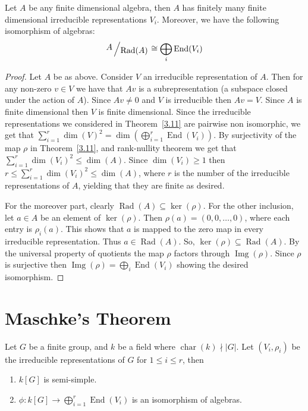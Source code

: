 \begin{corollary}
    Let $A$ be any finite dimensional algebra, then $A$ has finitely many finite dimensional irreducible representations $V_i$. Moreover, we have the following isomorphism of algebras:
    \begin{align*}
    \bigslant{A}{\operatorname{Rad}(A)} \cong \bigoplus_{i} \operatorname{End}(V_i)
    \end{align*}
\end{corollary}
\begin{proof}
    Let $A$ be as above. Consider $V$ an irreducible representation of $A$. Then for any non-zero $v \in V$ we have that $Av$ is a subrepresentation (a subspace closed under the action of $A$). Since $Av \neq 0$ and $V$ is irreducible then $Av = V$. Since $A$ is finite dimensional then $V$ is finite dimensional. Since the irreducible representations we considered in Theorem~\ref{3.11} are pairwise non isomorphic, we get that $\sum_{i =1}^{r} \dim(V)^2 = \dim(\bigoplus_{i=1}^{r} \operatorname{End}(V_i))$. By surjectivity of the map $\rho$ in Theorem~\ref{3.11}, and rank-nullity theorem we get that $\sum_{i =1}^{r} \dim(V_i)^2 \leq \dim(A)$. Since $\dim(V_i) \geq 1$ then $r \leq  \sum_{i =1}^{r} \dim(V_i)^2 \leq \dim(A)$, where $r$ is the number of the irreducible representations of $A$, yielding that they are finite as desired. 
   
    For the moreover part, clearly $\operatorname{Rad}(A) \subseteq \ker(\rho)$. For the other inclusion, let $a \in A$ be an element of $\ker(\rho)$. Then $\rho(a) = (0,0, \dots , 0)$, where each entry is $\rho_i(a)$. This shows that $a$ is mapped to the zero map in every irreducible representation. Thus $a \in \operatorname{Rad}(A)$. So, $\ker(\rho) \subseteq \operatorname{Rad}(A)$. By the universal property of quotients the map $\rho$ factors through $\operatorname{Img}(\rho)$. Since $\rho$ is surjective then $\operatorname{Img}(\rho) = \bigoplus_{i} \operatorname{End}(V_i)$ showing the desired isomorphism.
\end{proof}
\section{Maschke's Theorem}

   \begin{theorem}
    Let $G$ be a finite group, and $k$ be a field where $\operatorname{char}(k) \nmid |G|$. Let $(V_i, \rho_i)$ be the irreducible representations of $G$ for $ 1 \leq i \leq r$, then
    \begin{enumerate}
        \item $k[G]$ is semi-simple.
        \item $\phi: k[G] \to \displaystyle \bigoplus_{i =1}^{r} \operatorname{End}(V_i)$ is an isomorphism of algebras.
    \end{enumerate}
\end{theorem}

